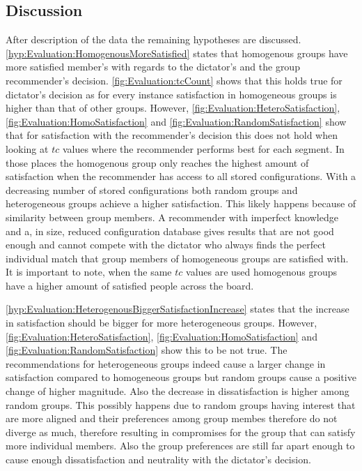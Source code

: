 \subsection{Discussion}

After description of the data the remaining hypotheses are discussed.
\autoref{hyp:Evaluation:HomogenousMoreSatisfied} states that homogenous groups have more satisfied member's with regards to the dictator's and the group recommender's decision. \autoref{fig:Evaluation:tcCount} shows that this holds true for dictator's decision as for every instance satisfaction in homogeneous groups is higher than that of other groups. However, \autoref{fig:Evaluation:HeteroSatisfaction}, \autoref{fig:Evaluation:HomoSatisfaction} and \autoref{fig:Evaluation:RandomSatisfaction} show that for satisfaction with the recommender's decision this does not hold when looking at $tc$ values where the recommender performs best for each  segment. In those places the homogenous group only reaches the highest amount of satisfaction when the recommender has access to all stored configurations. With a decreasing number of stored configurations both random groups and heterogeneous groups achieve a higher satisfaction. This likely happens because of similarity between group members. A recommender with imperfect knowledge and a, in size, reduced configuration database gives results that are not good enough and cannot compete with the dictator who always finds the perfect individual match that group members of homogeneous groups are satisfied with. It is important to note, when the same $tc$ values are used homogenous groups have a higher amount of satisfied people across the board.

\autoref{hyp:Evaluation:HeterogenousBiggerSatisfactionIncrease} states that the increase in satisfaction should be bigger for more heterogeneous groups. However, \autoref{fig:Evaluation:HeteroSatisfaction}, \autoref{fig:Evaluation:HomoSatisfaction} and \autoref{fig:Evaluation:RandomSatisfaction} show this to be not true. The recommendations for heterogeneous groups indeed cause a larger change in satisfaction compared to homogeneous groups but random groups cause a positive change of higher magnitude. Also the decrease in dissatisfaction is higher among random groups. This possibly happens due to random groups having interest that are more aligned and their preferences among group membes therefore do not diverge as much, therefore resulting in compromises for the group that can satisfy more individual members. Also the group preferences are still far apart enough to cause enough dissatisfaction and neutrality with the dictator's decision.

